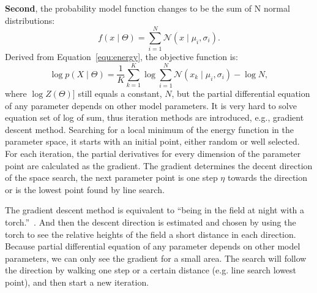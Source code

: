 \documentclass[11pt,twoside,a4paper]{article}
\begin{document}
	\textbf{Second}, the probability model function changes to be the sum of N normal distributions: 
	\begin{equation}
	f(x \mid \Theta ) = \sum_{i=1}^N\mathcal{N}(x \mid \mu_i, \sigma_i ).
	\end{equation}
	Derived from Equation~\ref{equ:energy}, the objective function is:
	\begin{equation}
	\log p(X \mid \Theta ) = \frac{1}{K}\sum_{k=1}^K \log \sum_{i=1}^N \mathcal{N}(x_k \mid \mu_i, \sigma_i ) - \log N,
	\end{equation}
	where $\log Z( \Theta)]$ still equals a constant, $ N $, but the partial differential equation of any parameter depends on other model parameters.
	It is very hard to solve equation set of log of sum, thus iteration methods are introduced, e.g., gradient descent method. %
	Searching for a local minimum of the energy function in the parameter space, it starts with an initial point, either random or well selected.
	For each iteration, the partial derivatives for every dimension of the parameter point are calculated as the gradient.
	The gradient determines the decent direction of the space search, the next parameter point is one step $ \eta $  towards the direction or is the lowest point found by line search.
	
	The gradient descent method is equivalent to ``being in the field at night with a torch.''~\cite{woodfordnotes}.
	And then the descent direction is estimated and chosen by using the torch to see the relative heights of the field a short distance in each direction.
	Because partial differential equation of any parameter depends on other model parameters, we can only see the gradient for a small area.
	The search will follow the direction by walking one step or a certain distance (e.g. line search lowest point), and then start a new iteration.
	
\end{document}
